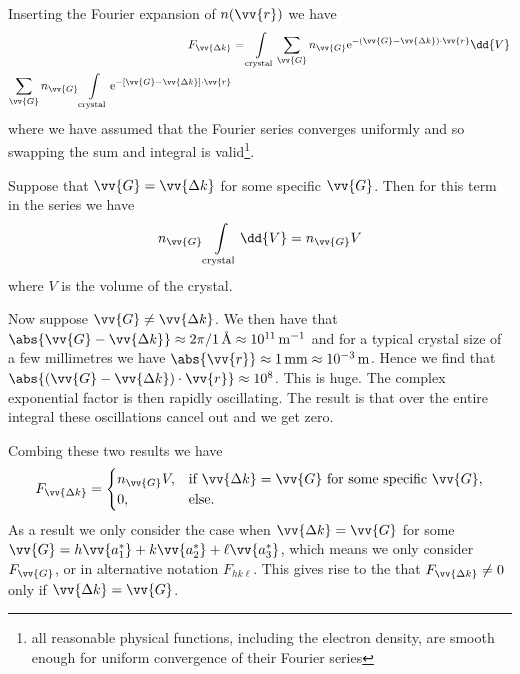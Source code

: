 \documentclass[fleqn]{NotesClass}
\newcommand*{\e}{\mathrm{e}}
\begin{document}
    Inserting the Fourier expansion of \(n(\vv{r})\) we have
    \begin{align}
        F_{\vv{\Delta k}} &= \int\limits_{\text{crystal}} \sum_{\vv{G}} n_{\vv{G}} \e^{-(\vv{G} - \vv{\Delta k})\cdot\vv{r}}\dd{V}\\
        \sum_{\vv{G}} n_{\vv{G}} \int\limits_{\text{crystal}} \e^{-[\vv{G} - \vv{\Delta k}]\cdot\vv{r}}
    \end{align}
    where we have assumed that the Fourier series converges uniformly and so swapping the sum and integral is valid\footnote{all reasonable physical functions, including the electron density, are smooth enough for uniform convergence of their Fourier series}.
    
    Suppose that \(\vv{G} = \vv{\Delta k}\) for some specific \(\vv{G}\).
    Then for this term in the series we have
    \begin{equation}
        n_{\vv{G}} \int\limits_{\text{crystal}} \dd{V} = n_{\vv{G}}V
    \end{equation}
    where \(V\) is the volume of the crystal.
    
    Now suppose \(\vv{G} \ne \vv{\Delta k}\).
    We then have that \(\abs{\vv{G} - \vv{\Delta k}} \approx 2\pi/\qty{1}{\angstrom} \approx \qty{e11}{m^{-1}}\) and for a typical crystal size of a few millimetres we have \(\abs{\vv{r}} \approx \qty{1}{\milli\meter} \approx \qty{e-3}{\meter}\).
    Hence we find that \(\abs{(\vv{G} - \vv{\Delta k})\cdot\vv{r}} \approx \num{e8}\).
    This is huge.
    The complex exponential factor is then rapidly oscillating.
    The result is that over the entire integral these oscillations cancel out and we get zero.
    
    Combing these two results we have
    \begin{equation}
        F_{\vv{\Delta k}} = 
        \begin{cases}
            n_{\vv{G}}V, &\text{if }\vv{\Delta k} = \vv{G}\text{ for some specific }\vv{G},\\
            0, &\text{else}.
        \end{cases}
    \end{equation}
    As a result we only consider the case when \(\vv{\Delta k} = \vv{G}\) for some \(\vv{G} = h\vv{a_1^*} + k\vv{a_2^*} + \ell\vv{a_3^*}\), which means we only consider \(F_{\vv{G}}\), or in alternative notation \(F_{hk\ell}\).
    This gives rise to the  that \(F_{\vv{\Delta k}} \ne 0\) only if \(\vv{\Delta k} = \vv{G}\).
    
\end{document}
